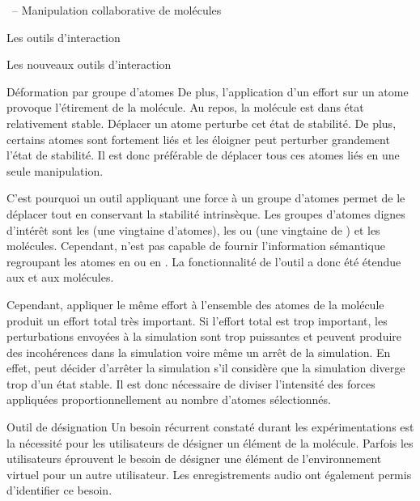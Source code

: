 \documentclass[myfrancais]{mythesis}
\begin{document}
\begin{mychapter}{\myShaddock\ -- Manipulation collaborative de molécules}
\begin{mysection}{Les outils d'interaction}
\begin{mysubsection}{Les nouveaux outils d'interaction}
\begin{mysubsubsection}{Déformation par groupe d'atomes}
					De plus, l'application d'un effort sur un atome provoque l'étirement de la molécule.
					Au repos, la molécule est dans état relativement stable.
					Déplacer un atome perturbe cet état de stabilité.
					De plus, certains atomes sont fortement liés et les éloigner peut perturber grandement l'état de stabilité.
					Il est donc préférable de déplacer tous ces atomes liés en une seule manipulation.

					C'est pourquoi un outil appliquant une force à un groupe d'atomes permet de le déplacer tout en conservant la stabilité intrinsèque.
					Les groupes d'atomes dignes d'intérêt sont les  (une vingtaine d'atomes), les \myhelice* ou \myfeuillet* (une vingtaine de ) et les molécules.
					Cependant,  n'est pas capable de fournir l'information sémantique regroupant les atomes en \myhelice* ou en \myfeuillet*.
					La fonctionnalité de l'outil  a donc été étendue aux  et aux molécules.

					Cependant, appliquer le même effort à l'ensemble des atomes de la molécule produit un effort total très important.
					Si l'effort total est trop important, les perturbations envoyées à la simulation sont trop puissantes et peuvent produire des incohérences dans la simulation voire même un arrêt de la simulation.
					En effet,  peut décider d'arrêter la simulation s'il considère que la simulation diverge trop d'un état stable.
					Il est donc nécessaire de diviser l'intensité des forces appliquées proportionnellement au nombre d'atomes sélectionnés.
				\end{mysubsubsection}
				\begin{mysubsubsection}{Outil de désignation}
					Un besoin récurrent constaté durant les expérimentations est la nécessité pour les utilisateurs de désigner un élément de la molécule.
					Parfois les utilisateurs éprouvent le besoin de désigner une élément de l'environnement virtuel pour un autre utilisateur.
					Les enregistrements audio ont également permis d'identifier ce besoin.


\end{mysubsubsection}
\end{mysubsection}
\end{mysection}
\end{mychapter}
\end{document}
